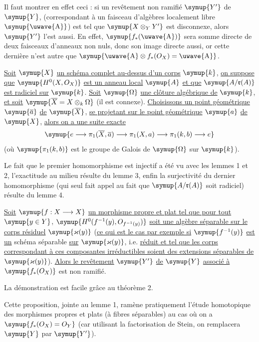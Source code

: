 Il faut montrer en effet ceci : si un revêtement non ramifié $\symup{Y'}$ de $\symup{Y}$,
(correspondant à un faisceau d'algèbres localement libre $\symup{\text{\uwave{A}}}$) est tel
que $\symup{X\otimes_Y Y'}$ est disconnexe, alors $\symup{Y'}$ l'est aussi. En effet,
$\symup{f_*(\text{\uwave{A}})}$ sera somme directe de deux faisceaux d'anneaux non nuls, donc
son image directe aussi, or cette dernière n'est autre que
$\symup{\text{\uwave{A}}\otimes f_*(O_X)=\text{\uwave{A}}}$.

 \uline{Soit} $\symup{X}$ \uline{un schéma complet au-dessus d'un corps} $\symup{k}$, \uline{on
suppose que} $\symup{H^0(X,O_X)}$ \uline{est un anneau local} $\symup{A}$ \uline{et que}
$\symup{A/\mathfrak r(A)}$ \uline{est radiciel sur} $\symup{k}$. \uline{Soit} $\symup{\Omega}$ \uline{une clôture algébrique
de} $\symup{k}$, \uline{et soit} $\symup{\overline X=X\otimes_k\Omega}$ (il est connexe). \uline{Choisissons un
point géométrique} $\symup{\overline a}$ \uline{de} $\symup{\overline X}$, \uline{se projetant sur le point
géométrique} $\symup{a}$ \uline{de} $\symup{X}$, \uline{alors on a une suite exacte}
\[
  \symup{e\longrightarrow\pi_1(\overline X,\overline a)
  \longrightarrow\pi_1(X,a)
  \longrightarrow\pi_1(k,b)\longrightarrow e}
\]
(où $\symup{\pi_1(k,b)}$ est le groupe de Galois de $\symup{\Omega}$ sur $\symup{k}$).

Le fait que le premier homomorphisme est injectif a été vu avec les lemmes 1 et
2, l'exactitude au milieu résulte du lemme 3, enfin la surjectivité du dernier
homomorphisme (qui seul fait appel au fait que $\symup{A/\mathfrak r(A)}$ soit
radiciel) résulte du lemme 4.

 \uline{Soit} $\symup{f:X\longrightarrow X}$ \uline{un morphisme propre et
plat tel que pour tout} $\symup{y\in Y}$,
$\symup{H^0(f^{-1}(y),O_{f^{-1}(y)})}$ \uline{soit une algèbre séparable sur le corps
résiduel} $\symup{\varkappa(y)}$ (\uline{ce qui est le cas par exemple si} $\symup{f^{-1}(y)}$ \uline{est un}
schéma séparable \uline{sur} $\symup{\varkappa(y)}$, i.e. \uline{réduit et tel que les corps correspondant
à ces composantes irréductibles soient des extensions séparables de}
$\symup{\varkappa(y)}$). \uline{Alors le revêtement}
$\symup{Y'}$ \uline{de} $\symup{Y}$ \uline{associé à} $\symup{f_*(O_X)}$ est non ramifié.

La démonstration est facile grâce au théorème 2.

Cette proposition, jointe au lemme 1, ramène pratiquement l'étude homotopique
des morphismes propres et plats (à fibres séparables) au cas où on a
$\symup{f_*(O_X)=O_Y}$ (car utilisant la factorisation de Stein, on remplacera
$\symup{Y}$ par $\symup{Y'}$).

